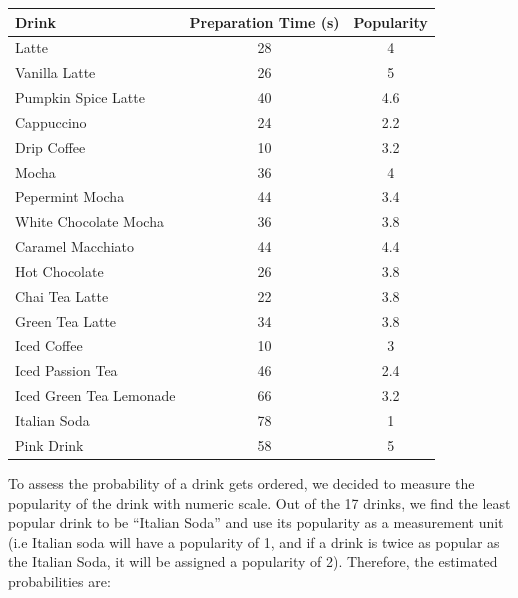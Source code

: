 \documentclass[a4paper]{article}
\begin{document}
\begin{center}
    \begin{tabular}{ l | c | c }
    	Drink & Preparation Time (s) & Popularity \\
        \hline
    	Latte&28&4\\
        Vanilla Latte&26&5\\
        Pumpkin Spice Latte&40&4.6\\
        Cappuccino&24&2.2\\
        Drip Coffee&10&3.2\\
        Mocha&36&4\\
        Pepermint Mocha&44&3.4\\
        White Chocolate Mocha&36&3.8\\
        Caramel Macchiato&44&4.4\\
        Hot Chocolate&26&3.8\\
        Chai Tea Latte&22&3.8\\
        Green Tea Latte&34&3.8\\
        Iced Coffee&10&3\\
        Iced Passion Tea&46&2.4\\
        Iced Green Tea Lemonade&66&3.2\\
        Italian Soda&78&1\\
        Pink Drink&58&5
    \end{tabular}
\end{center}

To assess the probability of a drink gets ordered, we decided to measure the popularity of the drink with numeric scale. Out of the 17 drinks, we find the least popular drink to be ``Italian Soda'' and use its popularity as a measurement unit (i.e Italian soda will have a popularity of 1, and if a drink is twice as popular as the Italian Soda, it will be assigned a popularity of 2). Therefore, the estimated probabilities are:
\end{document}
